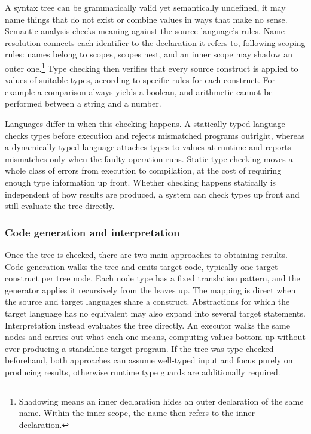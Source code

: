 A syntax tree can be grammatically valid yet semantically undefined,
it may name things that do not exist or combine values in ways that make no sense.
Semantic analysis checks meaning against the source language's rules.
Name resolution connects each identifier to the declaration it refers to,
following scoping rules: names belong to scopes, scopes nest,
and an inner scope may shadow an outer one.\footnote{
	Shadowing means an inner declaration hides
	an outer declaration of the same name.
	Within the inner scope, the name then refers to the inner declaration.
}
Type checking then verifies that every source construct is applied to
values of suitable types, according to specific rules for each construct.
For example a comparison always yields a boolean,
and arithmetic cannot be performed between a string and a number.

Languages differ in when this checking happens.
A statically typed language checks types before execution
and rejects mismatched programs outright,
whereas a dynamically typed language attaches types to values at runtime
and reports mismatches only when the faulty operation runs.
Static type checking moves a whole class of errors from execution to compilation,
at the cost of requiring enough type information up front.
Whether checking happens statically is independent of how results are produced,
a system can check types up front and still evaluate the tree directly.

\subsubsection{Code generation and interpretation}

Once the tree is checked, there are two main approaches to obtaining results.
Code generation walks the tree and emits target code,
typically one target construct per tree node.
Each node type has a fixed translation pattern,
and the generator applies it recursively from the leaves up.
The mapping is direct when the source and target languages share a construct.
Abstractions for which the target language has no equivalent
may also expand into several target statements.
Interpretation instead evaluates the tree directly.
An executor walks the same nodes and carries out what each one means,
computing values bottom-up without ever producing a standalone target program.
If the tree was type checked beforehand,
both approaches can assume well-typed input and focus purely on producing results,
otherwise runtime type guards are additionally required.

